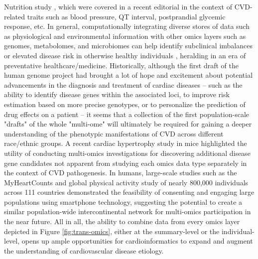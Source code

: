 \documentclass[letter]{bib}
\begin{document}
Nutrition study \citep{Zeevi:2015:Personalized}, which were covered in a recent editorial \citep{Lau:2018:Omics} in the context of CVD-related traits such as blood pressure, QT interval, postprandial glycemic response, etc.  In general, computationally integrating diverse stores of data such as physiological and environmental information with other omics layers such as genomes, metabolomes, and microbiomes can help identify subclinical imbalances or elevated disease risk in otherwise healthy individuals \citep{Lau:2018:Omics}, heralding in an era of preventative healthcare/medicine.  Historically, although the first draft of the human genome project had brought a lot of hope and excitement about potential advancements in the diagnosis and treatment of cardiac diseases -- such as the ability to identify disease genes within the associated loci, to improve risk estimation based on more precise genotypes, or to personalize the prediction of drug effects on a patient \citep{Komajda:2001:heart} -- it seems that a collection of the first population-scale "drafts" of the whole "multi-ome" will ultimately be required for gaining a deeper understanding of the phenotypic manifestations of CVD across different race/ethnic groups.  A recent cardiac hypertrophy study in mice \citep{Lau:2018:integrated} highlighted the utility of conducting multi-omics investigations for discovering additional disease gene candidates not apparent from studying each omics data type separately in the context of CVD pathogenesis.  In humans, large-scale studies such as the MyHeartCounts \citep{McConnell:2017:Feasibility} and global physical activity study of nearly 800,000 individuals across 111 countries \citep{Althoff:2017:Large} demonstrated the feasibility of consenting and engaging large populations using smartphone technology, suggesting the potential to create a similar population-wide intercontinental network for multi-omics participation in the near future.  All in all, the ability to combine data from every omics layer depicted in Figure \ref{fig:trans-omics}, either at the summary-level or the individual-level, opens up ample opportunities for cardioinformatics to expand and augment the understanding of cardiovascular disease etiology.
	
	
\end{document}
